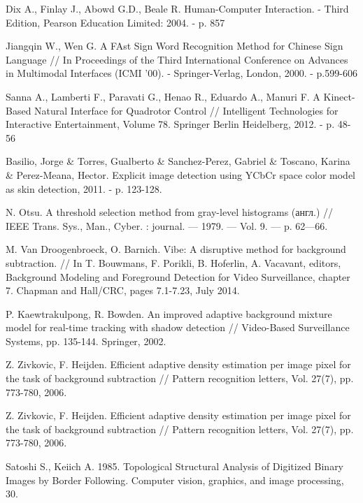 \newpage
\begin{thebibliography}{99}                    %

Dix A., Finlay J., Abowd G.D., Beale R. Human-Computer Interaction. - Third Edition, Pearson
Education Limited: 2004. - p. 857

Jiangqin W., Wen G. A FAst Sign Word Recognition Method for Chinese Sign Language // In 
Proceedings of the Third International Conference on Advances in Multimodal Interfaces (ICMI 
'00). - Springer-Verlag, London, 2000. - p.599-606

Sanna A., Lamberti F., Paravati G., Henao R., Eduardo A., Manuri F. A Kinect-Based Natural
Interface for Quadrotor Control // Intelligent Technologies for Interactive Entertainment, 
Volume 78. Springer Berlin Heidelberg, 2012. - p. 48-56


Basilio, Jorge \& Torres, Gualberto \& Sanchez-Perez, Gabriel \& Toscano,
Karina \& Perez-Meana, Hector. Explicit image detection using
YCbCr space color model as skin detection, 2011. - p. 123-128. 

N. Otsu. A threshold selection method from gray-level histograms
(англ.) // IEEE Trans. Sys., Man., Cyber. : journal. — 1979. — Vol. 9.
— p. 62—66.

M. Van Droogenbroeck, O. Barnich. Vibe: A disruptive
method for background subtraction. // In T. Bouwmans, F.
Porikli, B. Hoferlin, A. Vacavant, editors, Background
Modeling and Foreground Detection for Video Surveillance,
chapter 7. Chapman and Hall/CRC, pages 7.1-7.23, July
2014.

P. Kaewtrakulpong, R. Bowden. An improved adaptive 
background mixture model for real-time tracking with
shadow detection // Video-Based Surveillance Systems, pp.
135-144. Springer, 2002.

Z. Zivkovic, F. Heijden. Efficient adaptive density
estimation per image pixel for the task of background
subtraction // Pattern recognition letters, Vol. 27(7),
pp. 773-780, 2006.

Z. Zivkovic, F. Heijden. Efficient adaptive density
estimation per image pixel for the task of background
subtraction // Pattern recognition letters, Vol. 27(7),
pp. 773-780, 2006.

Satoshi S., Keiich A. 1985. Topological Structural Analysis of
Digitized Binary Images by Border Following. Computer vision, graphics,
and image processing, 30. 


\end{thebibliography}
